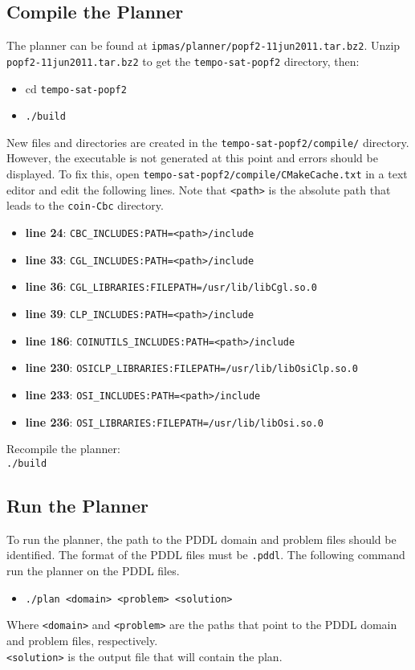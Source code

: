 \subsection{Compile the Planner}
The planner can be found at \texttt{ipmas/planner/popf2-11jun2011.tar.bz2}. Unzip \texttt{popf2-11jun2011.tar.bz2} to get the \texttt{tempo-sat-popf2} directory, then:
\begin{itemize}
\item cd \texttt{tempo-sat-popf2}
\item \texttt{./build}
\end{itemize}

New files and directories are created in the \texttt{tempo-sat-popf2/compile/} directory. However, the executable is not generated at this point and errors should be displayed. To fix this, open \texttt{tempo-sat-popf2/compile/CMakeCache.txt} in a text editor and edit the following lines. Note that \texttt{<path>} is the absolute path that leads to the \texttt{coin-Cbc} directory.


\begin{itemize}
\item \textbf{line 24}: \texttt{CBC\_INCLUDES:PATH=<path>/include}
\item \textbf{line 33}: \texttt{CGL\_INCLUDES:PATH=<path>/include}
\item \textbf{line 36}: \texttt{CGL\_LIBRARIES:FILEPATH=/usr/lib/libCgl.so.0}
\item \textbf{line 39}: \texttt{CLP\_INCLUDES:PATH=<path>/include}
\item \textbf{line 186}: \texttt{COINUTILS\_INCLUDES:PATH=<path>/include}
\item \textbf{line 230}: \texttt{OSICLP\_LIBRARIES:FILEPATH=/usr/lib/libOsiClp.so.0}
\item \textbf{line 233}: \texttt{OSI\_INCLUDES:PATH=<path>/include}
\item \textbf{line 236}: \texttt{OSI\_LIBRARIES:FILEPATH=/usr/lib/libOsi.so.0}
\end{itemize}

Recompile the planner:\\
\texttt{./build}


\subsection{Run the Planner}
To run the planner, the path to the PDDL domain and problem files should be identified. The format of the PDDL files must be \texttt{.pddl}. The following command run the planner on the PDDL files.

\begin{itemize}
\item \texttt{./plan <domain> <problem> <solution>}
\end{itemize}


Where \texttt{<domain>} and \texttt{<problem>} are the paths that point to the PDDL domain and problem files, respectively.\\\texttt{<solution>} is the output file that will contain the plan.
